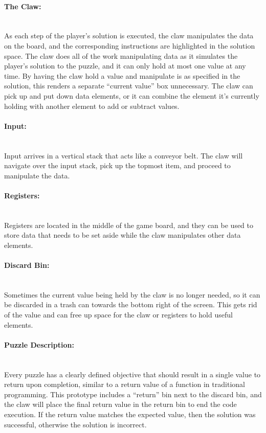 \paragraph{The Claw:} ~\\
As each step of the player's solution is executed, the claw manipulates the data on the board, and the corresponding instructions are highlighted in the solution space.
The claw does all of the work manipulating data as it simulates the player's solution to the puzzle, and it can only hold at most one value at any time.
By having the claw hold a value and manipulate is as specified in the solution, this renders a separate ``current value'' box unnecessary.
The claw can pick up and put down data elements, or it can combine the element it's currently holding with another element to add or subtract values.

\paragraph{Input:} ~\\
Input arrives in a vertical stack that acts like a conveyor belt. The claw will navigate over the input stack, pick up the topmost item, and proceed to manipulate the data.

\paragraph{Registers:} ~\\
Registers are located in the middle of the game board, and they can be used to store data that needs to be set aside while the claw manipulates other data elements.

\paragraph{Discard Bin:} ~\\
Sometimes the current value being held by the claw is no longer needed, so it can be discarded in a trash can towards the bottom right of the screen. This gets rid of the value and can free up space for the claw or registers to hold useful elements.

\paragraph{Puzzle Description:} ~\\
Every puzzle has a clearly defined objective that should result in a single value to return upon completion, similar to a return value of a function in traditional programming. This prototype includes a ``return'' bin next to the discard bin, and the claw will place the final return value in the return bin to end the code execution. If the return value matches the expected value, then the solution was successful, otherwise the solution is incorrect.\\




